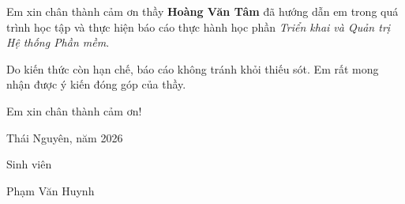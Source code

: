 \documentclass[../main.tex]{subfiles}
\begin{document}
Em xin chân thành cảm ơn thầy \textbf{Hoàng Văn Tâm} đã hướng dẫn em trong quá trình học tập và thực hiện báo cáo thực hành học phần \textit{Triển khai và Quản trị Hệ thống Phần mềm}.

Do kiến thức còn hạn chế, báo cáo không tránh khỏi thiếu sót. Em rất mong nhận được ý kiến đóng góp của thầy.

Em xin chân thành cảm ơn!

\vspace{1cm}

\begin{flushright}
Thái Nguyên, năm 2026

Sinh viên

\vspace{2cm}

Phạm Văn Huynh
\end{flushright}
\end{document}
